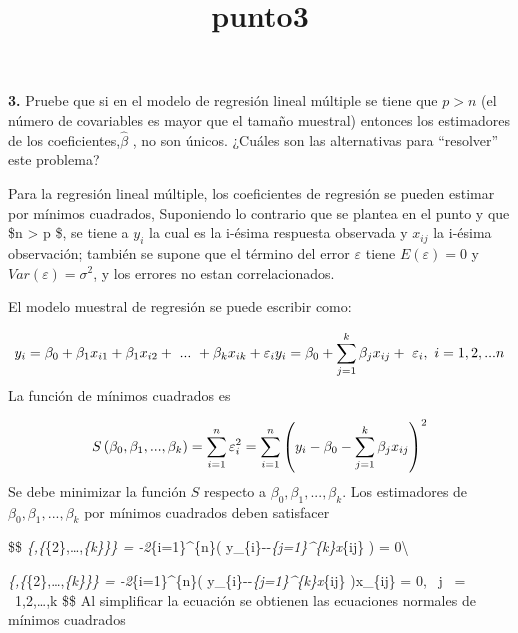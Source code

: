 \documentclass[
]{article}
\title{punto3}
\author{}
\date{\vspace{-2.5em}}
\begin{document}
\maketitle

\textbf{3.} Pruebe que si en el modelo de regresión lineal múltiple se
tiene que \(p > n\) (el número de covariables es mayor que el tamaño
muestral) entonces los estimadores de los
coeficientes,\(\widehat{\beta }\) , no son únicos. ¿Cuáles son las
alternativas para ``resolver'' este problema?

Para la regresión lineal múltiple, los coeficientes de regresión se
pueden estimar por mínimos cuadrados, Suponiendo lo contrario que se
plantea en el punto y que \$n \textgreater{} p \$, se tiene a \(y_{i}\)
la cual es la i-ésima respuesta observada y \(x_{ij}\) la i-ésima
observación; también se supone que el término del error \(\varepsilon\)
tiene \(E\left ( \varepsilon \right ) = 0\) y
\(Var\left ( \varepsilon \right ) = \sigma ^{2}\), y los errores no
estan correlacionados.

El modelo muestral de regresión se puede escribir como:

\[
y_{i}=\beta _{0}+\beta _{1}x_{i1}+\beta _{1}x_{i2}+\ ...\ +\beta _{k}x_{ik} +\varepsilon _{i}\\
y_{i}=\beta _{0}+\sum_{j=1}^{k}\beta _{j}x_{ij} +\ \varepsilon _{i},  \ i=1,2,...n
\] La función de mínimos cuadrados es

\[
S\left ( \beta _{0},\beta _{1}, ..., \beta _{k} \right ) = \sum_{i = 1}^{n}\varepsilon _{i}^{2}\\
 = \sum_{i = 1}^{n}\left ( y_{i}-\beta _{0}-\sum_{j=1}^{k}\beta _{j}x_{ij} \right )^{2}
\] Se debe minimizar la función \(S\) respecto a
\(\beta _{0},\beta _{1}, ..., \beta _{k}\). Los estimadores de
\(\beta _{0},\beta _{1}, ..., \beta _{k}\) por mínimos cuadrados deben
satisfacer

\$\$
\mid \emph{\{,\{\widehat\beta }\{2\},\ldots,\widehat\beta \emph{\{k\}\}\}
= -2\sum}\{i=1\}\^{}\{n\}\left (
y\_\{i\}--\sum\emph{\{j=1\}\^{}\{k\}x}\{ij\}
\right ) = 0\textbackslash{}

\mid \emph{\{,\{\widehat\beta }\{2\},\ldots,\widehat\beta \emph{\{k\}\}\}
= -2\sum}\{i=1\}\^{}\{n\}\left (
y\_\{i\}--\sum\emph{\{j=1\}\^{}\{k\}x}\{ij\}
\right )x\_\{ij\} = 0, ~j ~= ~1,2,\ldots,k \$\$ Al simplificar la
ecuación se obtienen las ecuaciones normales de mínimos cuadrados
\end{document}

